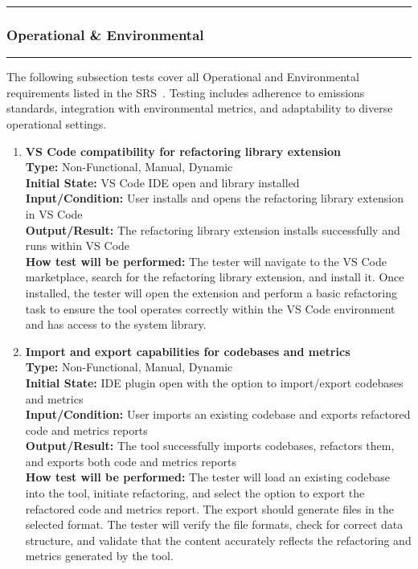 \documentclass[12pt, titlepage]{article}
\newcommand{\colorrule}{\textcolor{BlueViolet}{\rule{\linewidth}{2pt}}}
\begin{document}
  \noindent
  \colorrule

  \subsubsection{Operational \& Environmental}
  \colorrule

  \medskip

  \noindent
  The following subsection tests cover all Operational and
  Environmental requirements listed in the SRS~\cite{SRS}. Testing
  includes adherence to emissions standards, integration with
  environmental metrics, and adaptability to diverse operational settings.

  \begin{enumerate}[label={\bf
      \textcolor{Maroon}{test-OPE-\arabic*}}, wide=0pt, font=\itshape]
    \item \textbf{VS Code compatibility for refactoring library
      extension} \\[2mm]
      \textbf{Type:} Non-Functional, Manual, Dynamic \\
      \textbf{Initial State:} VS Code IDE open and library installed\\
      \textbf{Input/Condition:} User installs and opens the
      refactoring library extension in VS Code \\
      \textbf{Output/Result:} The refactoring library extension
      installs successfully and runs within VS Code \\[2mm]
      \textbf{How test will be performed:} The tester will navigate
      to the VS Code marketplace, search for the refactoring library
      extension, and install it. Once installed, the tester will open
      the extension and perform a basic refactoring task to ensure
      the tool operates correctly within the VS Code environment and
      has access to the system library.

    \item \textbf{Import and export capabilities for codebases and
      metrics} \\[2mm]
      \textbf{Type:} Non-Functional, Manual, Dynamic \\
      \textbf{Initial State:} IDE plugin open with the option to
      import/export codebases and metrics \\
      \textbf{Input/Condition:} User imports an existing codebase and
      exports refactored code and metrics reports \\
      \textbf{Output/Result:} The tool successfully imports
      codebases, refactors them, and exports both code and metrics
      reports \\[2mm]
      \textbf{How test will be performed:} The tester will load an
      existing codebase into the tool, initiate refactoring, and
      select the option to export the refactored code and metrics
      report. The export should generate files in the selected
      format. The tester will verify the file formats, check for
      correct data structure, and validate that the content
      accurately reflects the refactoring and metrics generated by the tool.


\end{enumerate}
\end{document}
